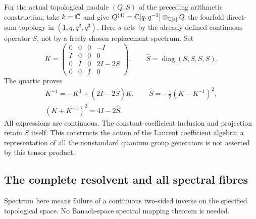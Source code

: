 For the actual topological module $(Q,S)$ of the preceding arithmetic
construction, take $k=\mathbb C$ and give
$Q^{(4)}=\mathbb C[q,q^{-1}]\otimes_{\mathbb C[s]}Q$ the fourfold direct-sum topology
in $(1,q,q^2,q^3)$. Here $s$ acts by the already defined continuous
operator $S$, not by a freely chosen replacement spectrum. Set
\begin{equation}\label{eq:gct-K}
 K=\begin{pmatrix}
 0&0&0&-I\\ I&0&0&0\\0&I&0&2I-2S\\0&0&I&0
 \end{pmatrix},\qquad \widehat S=\operatorname{diag}(S,S,S,S).
\end{equation}
The quartic proves
\begin{gather*}
 K^{-1}=-K^3+(2I-2\widehat S)K,\qquad
 \widehat S=-\tfrac12(K-K^{-1})^2,\\
 (K+K^{-1})^2=4I-2\widehat S.
\end{gather*}
All expressions are continuous. The constant-coefficient inclusion and
projection retain $S$ itself. This constructs the action of the Laurent
coefficient algebra; a representation of all the nonstandard quantum
group generators is not asserted by this tensor product.

\subsection{The complete resolvent and all spectral fibres}
Spectrum here means failure of a continuous two-sided inverse on the
specified topological space. No Banach-space spectral mapping theorem
is needed.


